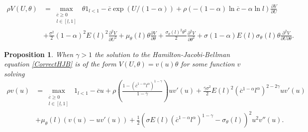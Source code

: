 \documentclass[11pt]{article}
\theoremstyle{plain}
\newtheorem{prop}[thm]{Proposition}
\begin{document}
\begin{equation}
\begin{aligned}
\rho V(U,\theta) & = \max_{\substack{\overline{c} \geq 0 \\ l \in [\underline{l}, 1]}} \ \theta 1_{l<1} - \overline{c}\exp(U/(1-\alpha)) + \rho{\left( - (1-\alpha)\ln \overline{c} - \alpha \ln l\right)}\frac{\partial V}{\partial U}
\\ & + \frac{\sigma^2}{2}(1-\alpha)^2E(l)^2\frac{\partial^2V}{\partial U^2} + \mu_{\theta}(l) \theta\frac{\partial V}{\partial \theta} + \frac{\sigma_{\theta}(l)^2 \theta^2}{2}\frac{\partial^2V}{\partial \theta^2}+ \sigma (1-\alpha)E(l) \sigma_{\theta}(l)\theta \frac{\partial^2V}{\partial U\partial \theta}.
\label{CorrectHJBlog}
\end{aligned}
\end{equation}

\begin{prop} \label{GENhjbMULT}
When $\gamma >1$ the solution to the Hamilton-Jacobi-Bellman equation \eqref{CorrectHJB} is of the form $V(U,\theta) = v(u)\theta$ for some function $v$ solving 
\begin{align*}
\rho v(u) & = \max_{\substack{\overline{c} \geq 0 \\ l \in [\underline{l}, 1]}} \ 1_{l<1} - \overline{c}u + \rho {\left(\frac{1 - (\overline{c}^{1-\alpha}l^{\alpha})^{1-\gamma}}{1-\overline{\gamma}}\right)}uv'(u) + \frac{\overline{\gamma}\sigma^2}{2}E(l)^2{\left(\overline{c}^{1-\alpha}l^{\alpha} \right)}^{2-2\gamma} uv'(u)
\\ & + \mu_{\theta}(l)(v(u) - uv'(u)) + \frac{1}{2}{\left(\sigma E(l){\left(\overline{c}^{1-\alpha}l^\alpha\right)}^{1-\gamma} - \sigma_{\theta}(l)\right)}^2 u^2v''(u).
\end{align*}%
\end{prop}
\end{document}

